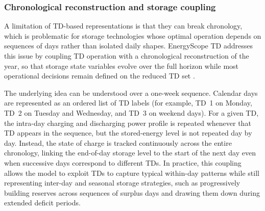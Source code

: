 \documentclass{article}
\begin{document}
\subsubsection{Chronological reconstruction and storage coupling}
A limitation of TD-based representations is that they can break chronology, which is problematic for storage technologies whose optimal operation depends on sequences of days rather than isolated daily shapes. EnergyScope TD addresses this issue by coupling TD operation with a chronological reconstruction of the year, so that storage state variables evolve over the full horizon while most operational decisions remain defined on the reduced TD set \citep{dominguez-munoz_selection_2011,limpensEnergyScopeTDNovel2019}.

The underlying idea can be understood over a one-week sequence. Calendar days are represented as an ordered list of TD labels (for example, TD~1 on Monday, TD~2 on Tuesday and Wednesday, and TD~3 on weekend days). For a given TD, the intra-day charging and discharging power profile is repeated whenever that TD appears in the sequence, but the stored-energy level is not repeated day by day. Instead, the state of charge is tracked continuously across the entire chronology, linking the end-of-day storage level to the start of the next day even when successive days correspond to different TDs. In practice, this coupling allows the model to exploit TDs to capture typical within-day patterns while still representing inter-day and seasonal storage strategies, such as progressively building reserves across sequences of surplus days and drawing them down during extended deficit periods.
\end{document}
